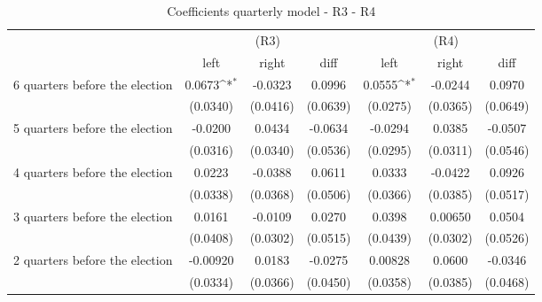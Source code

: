\begin{table}[!ht]\centering \footnotesize
\def\sym#1{\ifmmode^{#1}\else\(^{#1}\)\fi}
\caption{Coefficients quarterly model - R3 - R4}
\begin{tabular}{l*{6}{c}}
\hline\hline
                    &\multicolumn{3}{c}{(R3)}&\multicolumn{3}{c}{(R4)}\\
&\multicolumn{1}{c}{left}&\multicolumn{1}{c}{right}&\multicolumn{1}{c}{diff}&\multicolumn{1}{c}{left}&\multicolumn{1}{c}{right}&\multicolumn{1}{c}{diff}\\
\hline
 6 quarters before the election&      0.0673\sym{*}  &     -0.0323         &      0.0996         &      0.0555\sym{*}  &     -0.0244         &      0.0970         \\
                    &    (0.0340)         &    (0.0416)         &    (0.0639)         &    (0.0275)         &    (0.0365)         &    (0.0649)         \\
[0.5em]
 5 quarters before the election&     -0.0200         &      0.0434         &     -0.0634         &     -0.0294         &      0.0385         &     -0.0507         \\
                    &    (0.0316)         &    (0.0340)         &    (0.0536)         &    (0.0295)         &    (0.0311)         &    (0.0546)         \\
[0.5em]
 4 quarters before the election&      0.0223         &     -0.0388         &      0.0611         &      0.0333         &     -0.0422         &      0.0926         \\
                    &    (0.0338)         &    (0.0368)         &    (0.0506)         &    (0.0366)         &    (0.0385)         &    (0.0517)         \\
[0.5em]
 3 quarters before the election&      0.0161         &     -0.0109         &      0.0270         &      0.0398         &     0.00650         &      0.0504         \\
                    &    (0.0408)         &    (0.0302)         &    (0.0515)         &    (0.0439)         &    (0.0302)         &    (0.0526)         \\
[0.5em]
 2 quarters before the election&    -0.00920         &      0.0183         &     -0.0275         &     0.00828         &      0.0600         &     -0.0346         \\
                    &    (0.0334)         &    (0.0366)         &    (0.0450)         &    (0.0358)         &    (0.0385)         &    (0.0468)         \\

\end{tabular}
\end{table}
